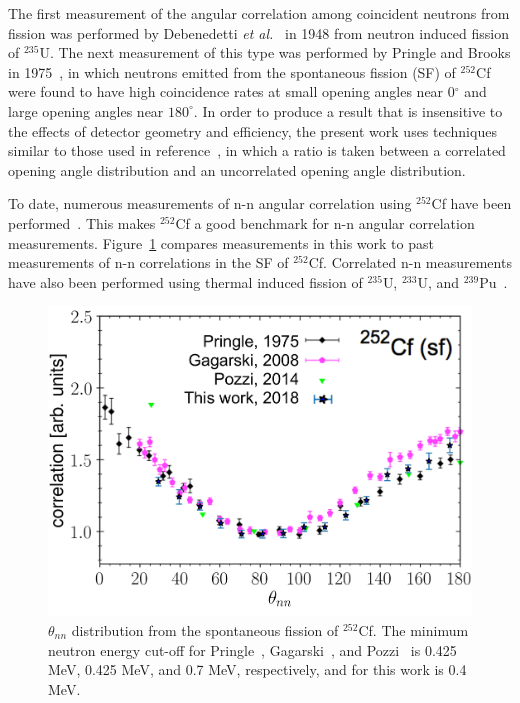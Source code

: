 The first measurement of the angular correlation among coincident neutrons from fission was performed by Debenedetti \emph{et al.}~\cite{1948twoNCorr} in 1948 from neutron induced fission of $^{235}\text{U}$.
The next measurement of this type was performed by Pringle and Brooks in 1975~\cite{1975Cf252}, in which neutrons emitted from the spontaneous fission (SF) of $^{252}$Cf were found to have high coincidence rates at small opening angles near 0$^{\circ}$ and large opening angles near $180^{\circ}$.
In order to produce a result that is insensitive to the effects of detector geometry and efficiency, the present work uses techniques similar to those used in reference~\cite{1975Cf252}, in which a ratio is taken between a correlated opening angle distribution and an uncorrelated opening angle distribution.

To date, numerous measurements of n-n angular correlation using $^{252}$Cf have been performed~\cite{Verbeke2018, Pozzi2014, 2008CF252, 1975Cf252}.
This makes $^{252}$Cf a good benchmark for n-n angular correlation measurements.
Figure~\ref{fig:Cf252_us_vs_them} compares measurements in this work to past measurements of n-n correlations in the SF of $^{252}$Cf.
Correlated n-n measurements have also been performed using thermal induced fission of $^{235}$U, $^{233}$U, and $^{239}$Pu~\cite{Sokolov2010}.
\begin{figure}[h]
\centering
\includegraphics[width=\figsmall\textwidth]{Cf252_us_vs_them.png}
\caption{$\theta_{nn}$ distribution from the spontaneous fission of $^{252}$Cf.
 The minimum neutron energy cut-off for Pringle~\cite{1975Cf252}, Gagarski~\cite{2008CF252}, and Pozzi~\cite{Pozzi2016} is 0.425 MeV, 0.425 MeV, and 0.7 MeV, respectively, and for this work is 0.4 MeV.
}
\label{fig:Cf252_us_vs_them}
\end{figure}

